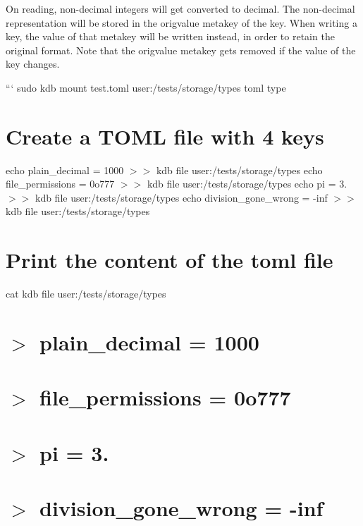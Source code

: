 On reading, non-\/decimal integers will get converted to decimal. The non-\/decimal representation will be stored in the {\ttfamily origvalue} metakey of the key. When writing a key, the value of that metakey will be written instead, in order to retain the original format. Note that the {\ttfamily origvalue} metakey gets removed if the value of the key changes.

``` sudo kdb mount test.\+toml user\+:/tests/storage/types toml type\hypertarget{autotoc_md635_autotoc_md639}{}\section{Create a T\+O\+M\+L file with 4 keys}\label{autotoc_md635_autotoc_md639}
echo \textquotesingle{}plain\+\_\+decimal = 1000\textquotesingle{} $>$$>$ {\ttfamily kdb file user\+:/tests/storage/types} echo \textquotesingle{}file\+\_\+permissions = 0o777\textquotesingle{} $>$$>$ {\ttfamily kdb file user\+:/tests/storage/types} echo \textquotesingle{}pi = 3.\textquotesingle{} $>$$>$ {\ttfamily kdb file user\+:/tests/storage/types} echo \textquotesingle{}division\+\_\+gone\+\_\+wrong = -\/inf\textquotesingle{} $>$$>$ {\ttfamily kdb file user\+:/tests/storage/types}\hypertarget{autotoc_md635_autotoc_md640}{}\section{Print the content of the toml file}\label{autotoc_md635_autotoc_md640}
cat {\ttfamily kdb file user\+:/tests/storage/types} \hypertarget{autotoc_md635_autotoc_md641}{}\section{$>$ plain\+\_\+decimal = 1000}\label{autotoc_md635_autotoc_md641}
\hypertarget{autotoc_md635_autotoc_md642}{}\section{$>$ file\+\_\+permissions = 0o777}\label{autotoc_md635_autotoc_md642}
\hypertarget{autotoc_md635_autotoc_md643}{}\section{$>$ pi = 3.}\label{autotoc_md635_autotoc_md643}
\hypertarget{autotoc_md635_autotoc_md644}{}\section{$>$ division\+\_\+gone\+\_\+wrong = -\/inf}\label{autotoc_md635_autotoc_md644}
